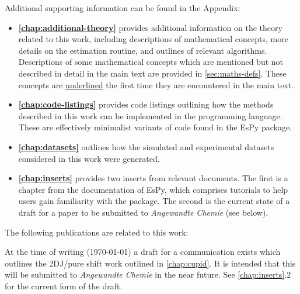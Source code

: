 Additional supporting information can be found in the Appendix:
\begin{itemize}
    \item \textbf{\cref{chap:additional-theory}} provides additional
        information on the theory related to this work, including descriptions
        of mathematical concepts, more details on the estimation
        routine, and outlines of relevant algorithms. Descriptions of some
        mathematical concepts which are mentioned but not described in detail
        in the main text are provided in \cref{sec:maths-defs}. These
        concepts are \underline{underlined} the first time they are encountered
        in the main text.
    \item \textbf{\cref{chap:code-listings}} provides code listings outlining
        how the methods described in this work can be implemented in the
        \Python programming language.
        These are effectively minimalist variants of code found in the
        \ac{EsPy} package.
    \item \textbf{\cref{chap:datasets}} outlines how the simulated and
        experimental datasets considered in this work were generated.
    \item \textbf{\cref{chap:inserts}} provides two inserts from relevant
        documents. The first is a chapter from the documentation of \ac{EsPy},
        which comprises tutorials to help users gain familiarity with the
        package. The second is the current state of a draft for a paper to be
        submitted to \textit{Angewandte Chemie} (see below).
\end{itemize}

The following publications are related to this work:


At the time of writing (\today) a draft for a communication exists which
outlines the \ac{2DJ}/pure shift work outlined in \cref{chap:cupid}. It is
intended that this will be submitted to \textit{Angewandte Chemie} in the near
future.  See \cref{chap:inserts}.2 for the current form of the draft.
